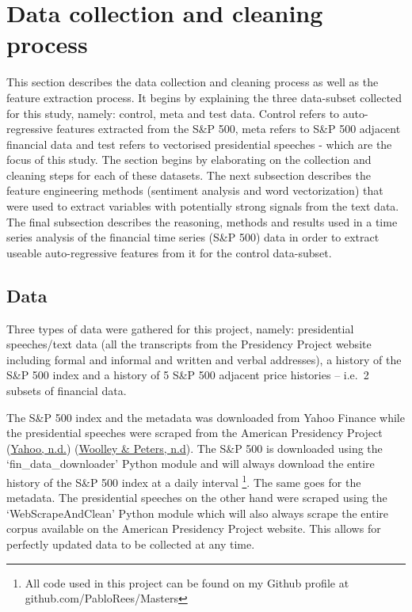 \documentclass[11pt,preprint, authoryear]{elsarticle}
\numberwithin{equation}{section}
\numberwithin{figure}{section}
\numberwithin{table}{section}
\let\rmarkdownfootnote\footnote%
\def\footnote{\protect\rmarkdownfootnote}
\begin{document}
\hypertarget{data-collection-and-cleaning-process}{%
\section{Data collection and cleaning
process}\label{data-collection-and-cleaning-process}}

This section describes the data collection and cleaning process as well
as the feature extraction process. It begins by explaining the three
data-subset collected for this study, namely: control, meta and test
data. Control refers to auto-regressive features extracted from the S\&P
500, meta refers to S\&P 500 adjacent financial data and test refers to
vectorised presidential speeches - which are the focus of this study.
The section begins by elaborating on the collection and cleaning steps
for each of these datasets. The next subsection describes the feature
engineering methods (sentiment analysis and word vectorization) that
were used to extract variables with potentially strong signals from the
text data. The final subsection describes the reasoning, methods and
results used in a time series analysis of the financial time series
(S\&P 500) data in order to extract useable auto-regressive features
from it for the control data-subset.

\hypertarget{data}{%
\subsection{Data}\label{data}}

Three types of data were gathered for this project, namely: presidential
speeches/text data (all the transcripts from the Presidency Project
website including formal and informal and written and verbal addresses),
a history of the S\&P 500 index and a history of 5 S\&P 500 adjacent
price histories -- i.e.~2 subsets of financial data.

The S\&P 500 index and the metadata was downloaded from Yahoo Finance
while the presidential speeches were scraped from the American
Presidency Project (\protect\hyperlink{ref-yahooSP500}{Yahoo, n.d.})
(\protect\hyperlink{ref-americanPresProj1}{Woolley \& Peters, n.d}). The
S\&P 500 is downloaded using the `fin\_data\_downloader' Python module
and will always download the entire history of the S\&P 500 index at a
daily interval \footnote{All code used in this project can be found on
  my Github profile at github.com/PabloRees/Masters}. The same goes for
the metadata. The presidential speeches on the other hand were scraped
using the `WebScrapeAndClean' Python module which will also always
scrape the entire corpus available on the American Presidency Project
website. This allows for perfectly updated data to be collected at any
time.
\end{document}

